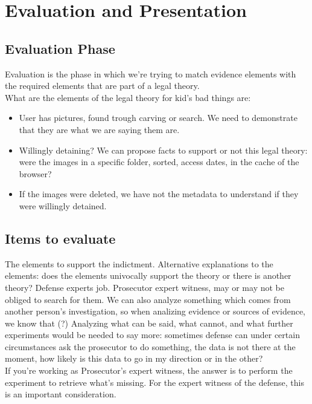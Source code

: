 \chapter{Evaluation and Presentation}
    \section{Evaluation Phase}
        Evaluation is the phase in which we're trying to match evidence elements with the required elements that are part of a legal theory.\\
        What are the elements of the legal theory for kid's bad things are:
        \begin{itemize}
            \item User has pictures, found trough carving or search. We need to demonstrate that they are what we are saying them are.
            \item Willingly detaining? We can propose facts to support or not this legal theory: were the images in a specific folder, sorted, access dates, in the cache of the browser?
            \item If the images were deleted, we have not the metadata to understand if they were willingly detained.
        \end{itemize}
    \section{Items to evaluate}
        The elements to support the indictment.
        Alternative explanations to the elements: does the elements univocally support the theory or there is another theory? Defense experts job. Prosecutor expert witness, may or may not be obliged to search for them.
        We can also analyze something which comes from another person's investigation, so when analizing evidence or sources of evidence, we know that (?) 
        Analyzing what can be said, what cannot, and what further experiments would be needed to say more: sometimes defense can under certain circumstances ask the prosecutor to do something, the data is not there at the moment, how likely is this data to go in my direction or in the other?\\
        If you're working as Prosecutor's expert witness, the answer is to perform the experiment to retrieve what's missing. For the expert witness of the defense, this is an important consideration.